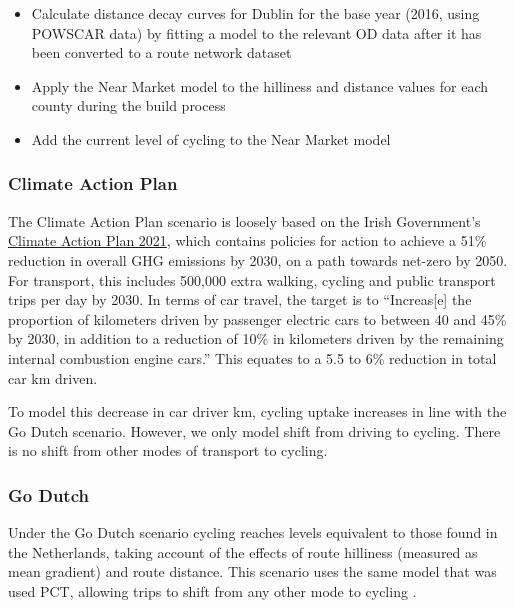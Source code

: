 \documentclass[
  super,
  preprint,
  3p]{elsarticle}
\providecommand{\tightlist}{%
  \setlength{\itemsep}{0pt}\setlength{\parskip}{0pt}}\usepackage{longtable,booktabs,array}
\begin{document}
\begin{itemize}
\tightlist
\item
  Calculate distance decay curves for Dublin for the base year (2016,
  using POWSCAR data) by fitting a model to the relevant OD data after
  it has been converted to a route network dataset
\item
  Apply the Near Market model to the hilliness and distance values for
  each county during the build process
\item
  Add the current level of cycling to the Near Market model
\end{itemize}

\hypertarget{climate-action-plan}{%
\subsubsection{Climate Action Plan}\label{climate-action-plan}}

The Climate Action Plan scenario is loosely based on the Irish
Government's
\href{https://www.gov.ie/en/publication/6223e-climate-action-plan-2021/}{Climate
Action Plan 2021}, which contains policies for action to achieve a 51\%
reduction in overall GHG emissions by 2030, on a path towards net-zero
by 2050. For transport, this includes 500,000 extra walking, cycling and
public transport trips per day by 2030. In terms of car travel, the
target is to ``Increas{[}e{]} the proportion of kilometers driven by
passenger electric cars to between 40 and 45\% by 2030, in addition to a
reduction of 10\% in kilometers driven by the remaining internal
combustion engine cars.'' This equates to a 5.5 to 6\% reduction in
total car km driven.

To model this decrease in car driver km, cycling uptake increases in
line with the Go Dutch scenario. However, we only model shift from
driving to cycling. There is no shift from other modes of transport to
cycling.

\hypertarget{go-dutch}{%
\subsubsection{Go Dutch}\label{go-dutch}}

Under the Go Dutch scenario cycling reaches levels equivalent to those
found in the Netherlands, taking account of the effects of route
hilliness (measured as mean gradient) and route distance. This scenario
uses the same model that was used PCT, allowing trips to shift from any
other mode to cycling \citep{lovelace2017}.
\end{document}
